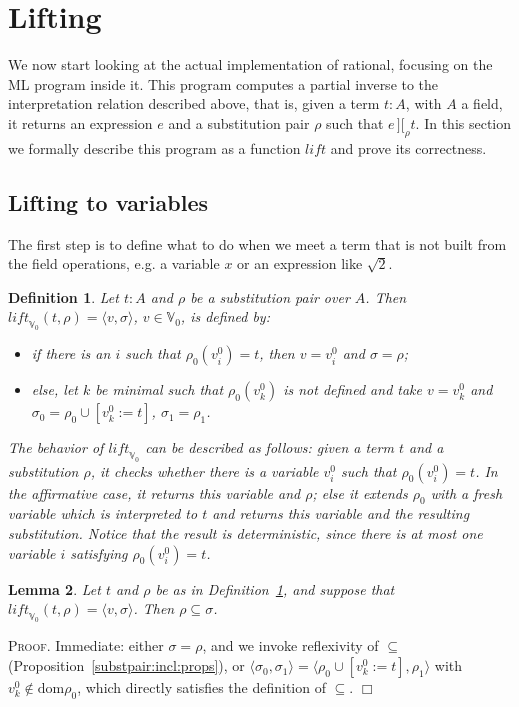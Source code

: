 \documentclass{article}
\newtheorem{definition}{Definition}[section]
\newtheorem{lemma}[definition]{Lemma}
\newenvironment{proof}{\smallskip\textsc{Proof.}}{\hspace*{\fill}$\Box$}
\newcommand{\intII}{\,]\![}
\newcommand{\intrel}{\mathbin{\intII_{\rho}}}
\newcommand{\V}{{\mathbb V}}
\newcommand{\tacticname}[1]{\textsf{#1}}
\newcommand{\rational}{\tacticname{rational}}
\newcommand{\liftv}[1]{\ensuremath{\mathit{lift}_{\V_{#1}}}}
\newcommand{\lift}{\ensuremath{\mathit{lift}}}
\newcommand{\dom}{\ensuremath{\mathrm{dom}}}
\begin{document}
\section{Lifting}\label{lifting}

We now start looking at the actual implementation of {\rational}, focusing
on the ML program inside it.
This program computes a partial
inverse to the interpretation relation described above, that is, given
a term $t:A$, with $A$ a field, it returns an expression $e$
and a substitution pair $\rho$ such that $e\intrel t$.
In this section we formally describe this program as a function
$\lift$ and prove its correctness.

\subsection{Lifting to variables}

The first step is to define what to do when we meet a term that is not
built from the field operations, e.g. a variable $x$ or an expression
like $\sqrt 2$.

\begin{definition}\label{defn:liftv0}
Let $t:A$ and $\rho$ be a substitution pair over $A$.  Then
$\liftv0(t,\rho)=\langle v,\sigma\rangle$, $v\in\V_0$, is defined by:
\begin{itemize}
\item if there is an $i$ such that $\rho_0(v^0_i)=t$, then $v=v^0_i$ and
$\sigma=\rho$;
\item else, let $k$ be minimal such that $\rho_0(v^0_k)$ is not defined
and take $v=v^0_k$ and $\sigma_0=\rho_0\cup[v^0_k:=t]$, $\sigma_1=\rho_1$.
\end{itemize}
The behavior of $\liftv0$ can be described as follows: given a term $t$ and
a substitution $\rho$, it checks whether there is a variable $v^0_i$ such that
$\rho_0(v^0_i)=t$.  In the affirmative case, it returns this variable and
$\rho$; else it extends $\rho_0$ with a fresh variable which is interpreted
to $t$ and returns this variable and the resulting substitution.  Notice
that the result is deterministic, since there is at most one variable $i$
satisfying $\rho_0(v^0_i)=t$.
\end{definition}

\begin{lemma}\label{liftv0incl}
Let $t$ and $\rho$ be as in Definition~\ref{defn:liftv0}, and suppose
that $\liftv0(t,\rho)=\langle v,\sigma\rangle$.  Then $\rho\subseteq\sigma$.
\end{lemma}
\begin{proof}
Immediate: either $\sigma=\rho$, and we invoke reflexivity of $\subseteq$
(Proposition~\ref{substpair:incl:props}), or
$\langle\sigma_0,\sigma_1\rangle=\langle\rho_0\cup[v^0_k:=t],\rho_1\rangle$
with $v^0_k\not\in\dom\rho_0$, which directly satisfies the definition of
$\subseteq$.
\end{proof}
\end{document}
